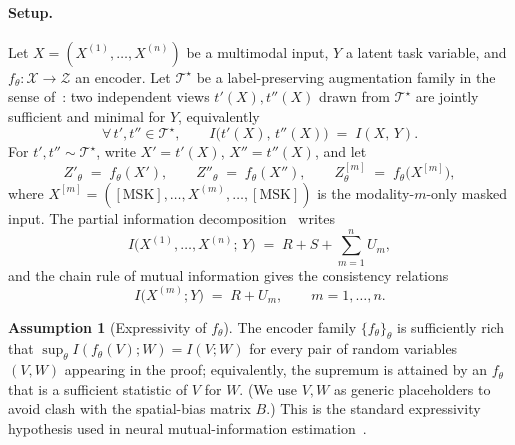 \documentclass{article}
\theoremstyle{plain}
\theoremstyle{definition}
\newtheorem{assumption}{Assumption}
\begin{document}
\paragraph{Setup.} Let $X = (X^{(1)}, \ldots, X^{(n)})$ be a multimodal input, $Y$ a latent task variable, and $f_\theta : \mathcal{X} \to \mathcal{Z}$ an encoder. Let $\mathcal{T}^\star$ be a label-preserving augmentation family in the sense of~\citet{tian2020what}: two independent views $t'(X), t''(X)$ drawn from $\mathcal{T}^\star$ are jointly sufficient and minimal for $Y$, equivalently
\begin{equation}\label{eq:assumption1}
  \forall\, t', t'' \in \mathcal{T}^\star, \qquad I\bigl(t'(X),\, t''(X)\bigr) \;=\; I(X,\, Y).
\end{equation}
For $t', t'' \sim \mathcal{T}^\star$, write $X' = t'(X)$, $X'' = t''(X)$, and let
\begin{equation}\label{eq:joint-and-masked-encodings}
  Z'_{\theta} \;=\; f_\theta(X'),
  \qquad
  Z''_{\theta} \;=\; f_\theta(X''),
  \qquad
  Z^{[m]}_{\theta} \;=\; f_\theta\bigl(X^{[m]}\bigr),
\end{equation}
where $X^{[m]} = ([\mathrm{MSK}], \ldots, X^{(m)}, \ldots, [\mathrm{MSK}])$ is the modality-$m$-only masked input. The partial information decomposition~\citep{williams2010nonnegative,bertschinger2014quantifying} writes
\begin{equation}\label{eq:pid}
  I\bigl(X^{(1)}, \ldots, X^{(n)};\, Y\bigr) \;=\; R + S + \sum_{m=1}^{n} U_m,
\end{equation}
and the chain rule of mutual information gives the consistency relations~\citep{bertschinger2014quantifying}
\begin{equation}\label{eq:pid-consistency}
  I\bigl(X^{(m)}; Y\bigr) \;=\; R + U_m, \qquad m = 1, \ldots, n.
\end{equation}

\begin{assumption}[Expressivity of $f_\theta$]\label{ass:expressivity}
The encoder family $\{f_\theta\}_\theta$ is sufficiently rich that $\sup_\theta I(f_\theta(V); W) = I(V; W)$ for every pair of random variables $(V, W)$ appearing in the proof; equivalently, the supremum is attained by an $f_\theta$ that is a sufficient statistic of $V$ for $W$. (We use $V, W$ as generic placeholders to avoid clash with the spatial-bias matrix $B$.) This is the standard expressivity hypothesis used in neural mutual-information estimation~\citep{oord2018representation,tian2020contrastive}.
\end{assumption}
\end{document}
